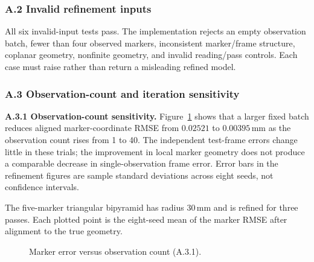 \documentclass[11pt]{article}
\begin{document}
\subsubsection*{A.2 Invalid refinement inputs}
All six invalid-input tests pass.  The implementation rejects an empty
observation batch, fewer than four observed markers, inconsistent marker/frame
structure, coplanar geometry, nonfinite geometry, and invalid reading/pass
controls.  Each case must raise  rather than return a
misleading refined model.

\subsubsection*{A.3 Observation-count and iteration sensitivity}
\noindent\textbf{A.3.1 Observation-count sensitivity.}
Figure~\ref{fig:validation-marker-observation-count} shows that a larger fixed
batch reduces aligned marker-coordinate RMSE from $0.02521$ to
$0.00395\,\mathrm{mm}$ as the observation count rises from 1 to 40.  The
independent test-frame errors change little in these trials; the improvement
in local marker geometry does not produce a comparable decrease in
single-observation frame error.  Error bars in the refinement figures are
sample standard deviations across eight seeds, not confidence intervals.

The five-marker triangular bipyramid has radius $30\,\mathrm{mm}$ and is
refined for three passes.  Each plotted point is the eight-seed mean of the
marker RMSE after alignment to the true geometry.

\begin{figure}[H]
\centering
{}
\caption{Marker error versus observation count (A.3.1).}
\label{fig:validation-marker-observation-count}
\end{figure}
\end{document}
